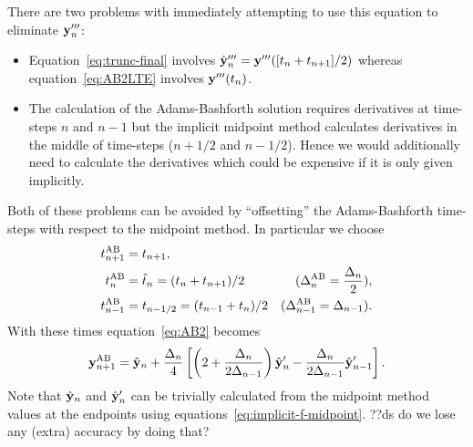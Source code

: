 
There are two problems with immediately attempting to use this equation to eliminate $\mathbf{y}'''_n$:
\begin{itemize}
\item Equation~\eqref{eq:trunc-final} involves $\hat{\mathbf{y}}_n''' = \mathbf{y}'''([t_n +t_{n+1}]/2)$ whereas equation~\eqref{eq:AB2LTE} involves $\mathbf{y}'''(t_n)$.
\item The calculation of the Adams-Bashforth solution requires derivatives at time-steps $n$ and $n-1$ but the implicit midpoint method calculates derivatives in the middle of time-steps (\ie $n+ 1/2$ and $n - 1/2$).
  Hence we would additionally need to calculate the derivatives which could be expensive if it is only given implicitly.
\end{itemize}

Both of these problems can be avoided by ``offsetting'' the Adams-Bashforth time-steps with respect to the midpoint method.
In particular we choose
\begin{align}
  t_{n+1}^{\text{AB}} &= t_{n+1}, \notag\\
  t_n^{\text{AB}} &= \hat{t}_n = (t_{n} + t_{n+1})/2 &(\Delta_{n}^{\text{AB}} = \frac{\Delta_{n}}{2}), \notag \\
  t_{n-1}^{\text{AB}} &= t_{n - 1/2} = (t_{n-1} + t_n)/2  &(\Delta_{n-1}^{\text{AB}} = \Delta_{n-1}).
  \label{eq:ab2-ts}
\end{align}
With these times equation~\eqref{eq:AB2} becomes
\begin{equation}
   \mathbf{y}_{n+1}^{\text{AB}} = \hat{\mathbf{y}}_n + \frac{\Delta_{n}}{4} \left[
     \left (2 + \frac{\Delta_{n}}{2\Delta_{n-1}} \right) \hat{\mathbf{y}}_n'
     - \frac{\Delta_{n}}{2\Delta_{n-1}} \hat{\mathbf{y}}_{n-1}'
     \right].
   \label{eq:AB2-mid}
\end{equation}
Note that $\hat{\mathbf{y}}_n$ and $\hat{\mathbf{y}}_n'$ can be trivially calculated from the midpoint method values at the endpoints using equations~\eqref{eq:implicit-f-midpoint}.
??ds do we lose any (extra) accuracy by doing that?


